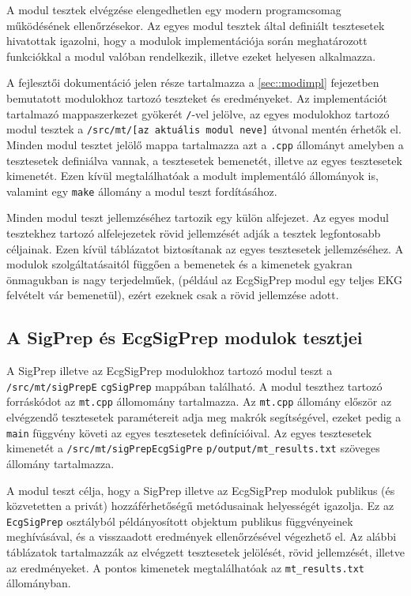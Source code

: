 \documentclass[oneside,titlepage,12pt,a4paper]{report}
\begin{document}
A modul tesztek elvégzése elengedhetlen egy modern programcsomag működésének ellenőrzésekor. Az egyes modul tesztek által definiált tesztesetek hivatottak igazolni, hogy a modulok implementációja során meghatározott funkciókkal a modul valóban rendelkezik, illetve ezeket helyesen alkalmazza. \par A fejlesztői dokumentáció jelen része tartalmazza a \ref{sec::modimpl} fejezetben bemutatott modulokhoz tartozó teszteket és eredményeket. Az implementációt tartalmazó mappaszerkezet gyökerét \texttt{/}-vel jelölve, az egyes modulokhoz tartozó modul tesztek a \texttt{/src/mt/[az aktuális modul neve]} útvonal mentén érhetők el. Minden modul tesztet jelölő mappa tartalmazza azt a \texttt{.cpp} állományt amelyben a tesztesetek definiálva vannak, a tesztesetek bemenetét, illetve az egyes tesztesetek kimenetét. Ezen kívül megtalálhatóak a modult implementáló állományok is, valamint egy \texttt{make} állomány a modul teszt fordításához. 
\par Minden modul teszt jellemzéséhez tartozik egy külön alfejezet. Az egyes modul tesztekhez tartozó alfelejezetek rövid jellemzését adják a tesztek legfontosabb céljainak. Ezen kívül táblázatot biztosítanak az egyes tesztesetek jellemzéséhez. A modulok szolgáltatásaitól függően a bemenetek és a kimenetek gyakran önmagukban is nagy terjedelműek, (például az EcgSigPrep modul egy teljes EKG felvételt vár bemenetül), ezért ezeknek csak a rövid jellemzése adott.   

\subsection{A SigPrep és EcgSigPrep modulok tesztjei}

A SigPrep illetve az EcgSigPrep modulokhoz tartozó modul teszt a \texttt{/src/mt/sigPrepE} \linebreak \texttt{cgSigPrep} mappában található. A modul teszthez tartozó forráskódot az \texttt{mt.cpp} állomomány tartalmazza. Az \texttt{mt.cpp} állomány először az elvégzendő tesztesetek paramétereit adja meg makrók segítségével, ezeket pedig a \texttt{main} függvény követi az egyes \linebreak  tesztesetek definícióival. Az egyes tesztesetek kimenetét a \texttt{/src/mt/sigPrepEcgSigPre} \linebreak  \texttt{p/output/mt\_results.txt} szöveges állomány tartalmazza. 
\par A modul teszt célja, hogy a SigPrep illetve az EcgSigPrep modulok publikus (és közvetetten a privát) hozzáférhetőségű metódusainak helyességét igazolja. Ez az \texttt{EcgSigPrep} osztályból példányosított objektum publikus függvényeinek meghívásával, és a visszaadott eredmények ellenőrzésével végezhető el. Az alábbi táblázatok tartalmazzák az elvégzett tesztesetek jelölését, rövid jellemzését, illetve az eredményeket. A pontos kimenetek megtalálhatóak az \texttt{mt\_results.txt} állományban. 
\end{document}
